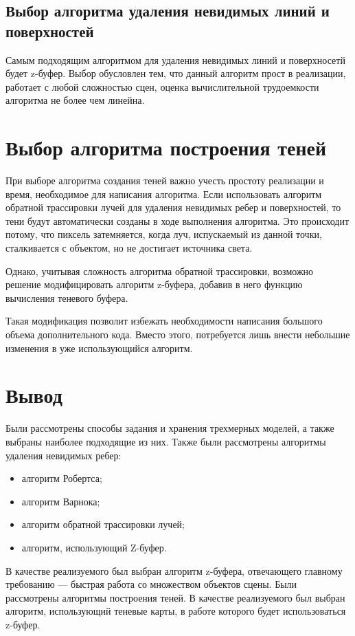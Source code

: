\subsection{Выбор алгоритма удаления невидимых линий и поверхностей}

Самым подходящим алгоритмом для удаления невидимых линий и поверхносетй будет z-буфер. Выбор обусловлен тем, что данный алгоритм прост в реализации,
работает с любой сложностью сцен, оценка вычислительной трудоемкости алгоритма не более чем линейна.

\section{Выбор алгоритма построения теней}

При выборе алгоритма создания теней важно учесть простоту реализации и время, необходимое для написания алгоритма. 
Если использовать алгоритм обратной трассировки лучей для удаления невидимых ребер и поверхностей, то тени будут автоматически 
созданы в ходе выполнения алгоритма. Это происходит потому, что пиксель затемняется, когда луч, испускаемый из данной точки, 
сталкивается с объектом, но не достигает источника света.

Однако, учитывая сложность алгоритма обратной трассировки, возможно решение модифицировать алгоритм z-буфера, добавив в него 
функцию вычисления теневого буфера.

Такая модификация позволит избежать необходимости написания большого объема дополнительного кода. Вместо этого, 
потребуется лишь внести небольшие изменения в уже использующийся алгоритм.

\section*{Вывод}
Были рассмотрены способы задания и хранения трехмерных моделей, а также выбраны наиболее подходящие из них.
Также были рассмотрены алгоритмы удаления невидимых ребер:
\begin{itemize}
    \item алгоритм Робертса;
    \item алгоритм Варнока;
    \item алгоритм обратной трассировки лучей;
    \item алгоритм, использующий Z-буфер.
\end{itemize}

В качестве реализуемого был выбран алгоритм z-буфера, отвечающего главному требованию --- быстрая работа со множеством объектов сцены. 
Были рассмотрены алгоритмы построения теней. В качестве реализуемого был выбран алгоритм, использующий теневые карты, в работе которого 
будет использоваться z-буфер.

